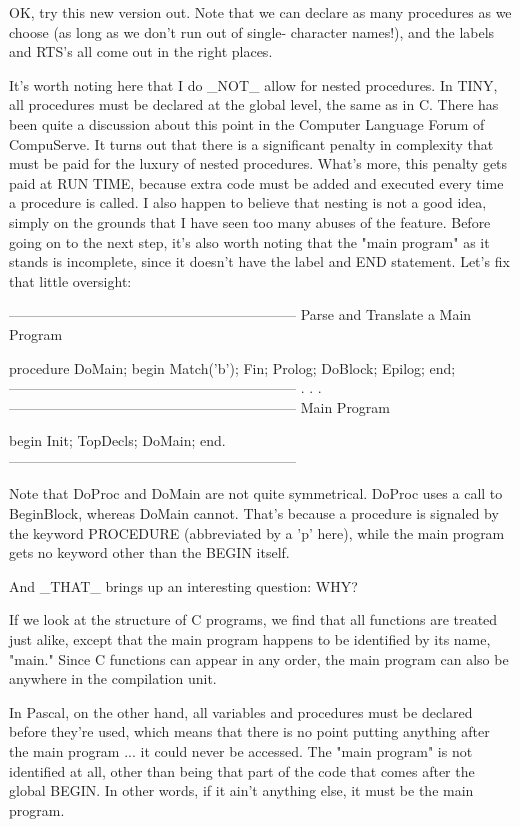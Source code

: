 \documentclass[float=false, crop=false]{standalone}
\begin{document}
OK, try this new version out. Note that we can declare as many procedures as we
choose (as long as we don't run out of single- character names!), and the labels
and RTS's all come out in the right places.

It's worth noting here that I do _NOT_ allow for nested procedures. In TINY, all
procedures must be declared at the global level, the same as in C. There has
been quite a discussion about this point in the Computer Language Forum of
CompuServe. It turns out that there is a significant penalty in complexity that
must be paid for the luxury of nested procedures. What's more, this penalty gets
paid at RUN TIME, because extra code must be added and executed every time a
procedure is called. I also happen to believe that nesting is not a good idea,
simply on the grounds that I have seen too many abuses of the feature. Before
going on to the next step, it's also worth noting that the "main program" as it
stands is incomplete, since it doesn't have the label and END statement. Let's
fix that little oversight:


{--------------------------------------------------------------}
{ Parse and Translate a Main Program }

procedure DoMain;
begin
     Match('b');
     Fin;
     Prolog;
     DoBlock;
     Epilog;
end;
{--------------------------------------------------------------}
.
.
.
{--------------------------------------------------------------}
{ Main Program }

begin
     Init;
     TopDecls;
     DoMain;
end.
{--------------------------------------------------------------}


Note that DoProc and DoMain are not quite symmetrical. DoProc uses a call to
BeginBlock, whereas DoMain cannot. That's because a procedure is signaled by the
keyword PROCEDURE (abbreviated by a 'p' here), while the main program gets no
keyword other than the BEGIN itself.

And _THAT_ brings up an interesting question: WHY?

If we look at the structure of C programs, we find that all functions are
treated just alike, except that the main program happens to be identified by its
name, "main." Since C functions can appear in any order, the main program can
also be anywhere in the compilation unit.

In Pascal, on the other hand, all variables and procedures must be declared
before they're used, which means that there is no point putting anything after
the main program ... it could never be accessed. The "main program" is not
identified at all, other than being that part of the code that comes after the
global BEGIN. In other words, if it ain't anything else, it must be the main
program.
\end{document}
